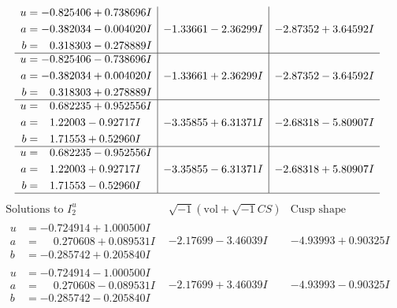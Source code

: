 \documentclass[1p]{elsarticle_modified}
\theoremstyle{definition}
\newcommand{\I}{\sqrt{-1}}
\begin{document}
$$\begin{array}{c|c|c}
\begin{aligned}
u &= -0.825406 + 0.738696 I \\
a &= -0.382034 - 0.004020 I \\
b &= \phantom{-}0.318303 - 0.278889 I\end{aligned}
 & -1.33661 - 2.36299 I & -2.87352 + 3.64592 I \\ \hline\begin{aligned}
u &= -0.825406 - 0.738696 I \\
a &= -0.382034 + 0.004020 I \\
b &= \phantom{-}0.318303 + 0.278889 I\end{aligned}
 & -1.33661 + 2.36299 I & -2.87352 - 3.64592 I \\ \hline\begin{aligned}
u &= \phantom{-}0.682235 + 0.952556 I \\
a &= \phantom{-}1.22003 - 0.92717 I \\
b &= \phantom{-}1.71553 + 0.52960 I\end{aligned}
 & -3.35855 + 6.31371 I & -2.68318 - 5.80907 I \\ \hline\begin{aligned}
u &= \phantom{-}0.682235 - 0.952556 I \\
a &= \phantom{-}1.22003 + 0.92717 I \\
b &= \phantom{-}1.71553 - 0.52960 I\end{aligned}
 & -3.35855 - 6.31371 I & -2.68318 + 5.80907 I\\
 \hline 
 \end{array}$$\newpage$$\begin{array}{c|c|c}  
\text{Solutions to }I^u_{2}& \I (\text{vol} + \sqrt{-1}CS) & \text{Cusp shape}\\
 \hline 
\begin{aligned}
u &= -0.724914 + 1.000500 I \\
a &= \phantom{-}0.270608 + 0.089531 I \\
b &= -0.285742 + 0.205840 I\end{aligned}
 & -2.17699 - 3.46039 I & -4.93993 + 0.90325 I \\ \hline\begin{aligned}
u &= -0.724914 - 1.000500 I \\
a &= \phantom{-}0.270608 - 0.089531 I \\
b &= -0.285742 - 0.205840 I\end{aligned}
 & -2.17699 + 3.46039 I & -4.93993 - 0.90325 I \\ \hline\begin{aligned}

\end{aligned}
\end{array}$$
\end{document}
